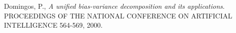 \documentclass[a4paper]{article}
\begin{document}

\begin{thebibliography}{9}

  Domingos, P.,
  \emph{A unified bias-variance decomposition and its applications}.
  PROCEEDINGS OF THE NATIONAL CONFERENCE ON ARTIFICIAL INTELLIGENCE
  564-569,
  2000.

\end{thebibliography}
\end{document}
